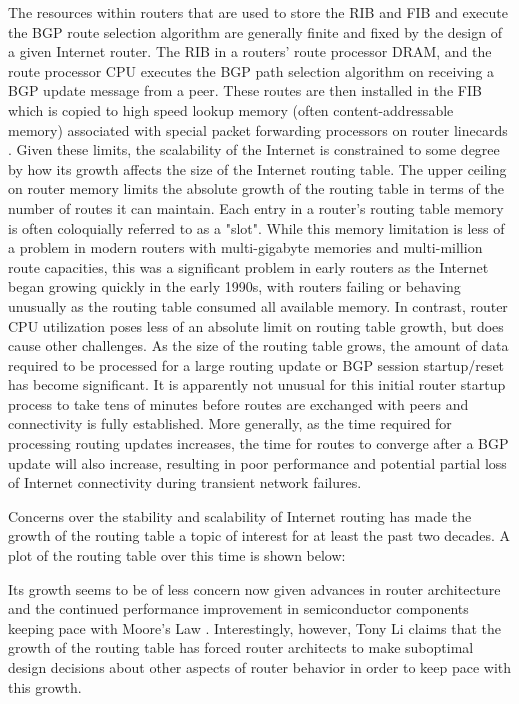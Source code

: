 The resources within routers that are used to store the RIB and FIB and execute the BGP route selection algorithm are generally finite and fixed by the design of a given Internet router. The RIB in a routers' route processor DRAM, and the route processor CPU executes the BGP path selection algorithm on receiving a BGP update message from a peer. These routes are then installed in the FIB which is copied to high speed lookup memory (often content-addressable memory) associated with special packet forwarding processors on router linecards \cite{}. Given these limits, the scalability of the Internet is constrained to some degree by how its growth affects the size of the Internet routing table. The upper ceiling on router memory limits the absolute growth of the routing table in terms of the number of routes it can maintain. Each entry in a router's routing table memory is often coloquially referred to as a "slot". While this memory limitation is less of a problem in modern routers with multi-gigabyte memories and multi-million route capacities, this was a significant problem in early routers as the Internet began growing quickly in the early 1990s, with routers failing or behaving unusually as the routing table consumed all available memory. In contrast, router CPU utilization poses less of an absolute limit on routing table growth, but does cause other challenges. As the size of the routing table grows, the amount of data required to be processed for a large routing update or BGP session startup/reset has become significant. It is apparently not unusual for this initial router startup process to take tens of minutes \cite{NANOG RAS inconvenient prefix} before routes are exchanged with peers and connectivity is fully established. More generally, as the time required for processing routing updates increases, the time for routes to converge after a BGP update will also increase, resulting in poor performance and potential partial loss of Internet connectivity during transient network failures.

Concerns over the stability and scalability of Internet routing has made the growth of the routing table a topic of interest for at least the past two decades. A plot of the routing table over this time is shown below:


Its growth seems to be of less concern now given advances in router architecture and the continued performance improvement in semiconductor components keeping pace with Moore's Law \cite{Davie, Huston}. Interestingly, however, Tony Li claims that the growth of the routing table has forced router architects to make suboptimal design decisions about other aspects of router behavior in order to keep pace with this growth.

